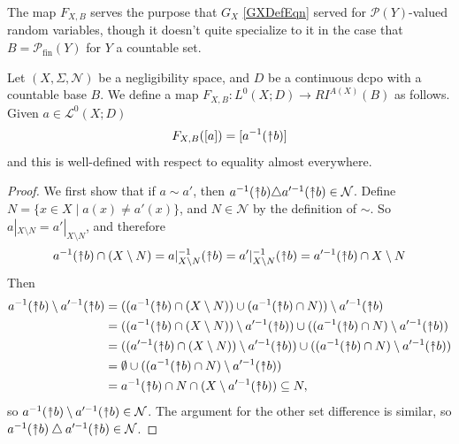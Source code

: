 \documentclass{lmcs}
\newcommand{\pfin}{\ensuremath{\powerset_{\mathrm{fin}}}}
\newcommand{\uu}{\rotatebox[origin=c]{90}{$\twoheadrightarrow$}}
\newcommand{\Ell}{\mathcal{L}}
\newcommand{\En}{\mathcal{N}}
\newcommand{\powerset}{\ensuremath{\mathcal{P}}}
\newcommand{\symdiff}{\mathbin{\triangle}}
\begin{document}
The map $F_{X,B}$ serves the purpose that $G_X$ \eqref{GXDefEqn} served for $\powerset(Y)$-valued random variables, though it doesn't quite specialize to it in the case that $B = \pfin(Y)$ for $Y$ a countable set. 

\begin{defi}
Let $(X,\Sigma,\En)$ be a negligibility space, and $D$ be a continuous dcpo with a countable base $B$. We define a map $F_{X,B} : L^0(X;D) \rightarrow RI^{A(X)}(B)$ as follows. Given $a \in \Ell^0(X;D)$
\[
F_{X,B}([a]) = [a^{-1}(\uu b)]
\]
and this is well-defined with respect to equality almost everywhere. 
\end{defi}
\begin{proof}
We first show that if $a \sim a'$, then $a^{-1}(\uu b) \triangle a'^{-1}(\uu b) \in \En$. Define $N = \{ x \in X \mid a(x) \neq a'(x) \}$, and $N \in \En$ by the definition of $\sim$. So $a|_{X \setminus N} = a'|_{X \setminus N}$, and therefore 
\[
a^{-1}(\uu b) \cap (X \setminus N) = a|_{X \setminus N}^{-1}(\uu b) = a'|_{X \setminus N}^{-1}(\uu b) = a'^{-1}(\uu b) \cap X \setminus N
\]
Then
\begin{align*}
a^{-1}(\uu b) \setminus a'^{-1}(\uu b) &= ((a^{-1}(\uu b) \cap (X \setminus N)) \cup (a^{-1}(\uu b) \cap N)) \setminus a'^{-1}(\uu b) \\
 &= ((a^{-1}(\uu b) \cap (X \setminus N)) \setminus a'^{-1}(\uu b)) \cup ((a^{-1}(\uu b) \cap N) \setminus a'^{-1}(\uu b)) \\
 &= ((a'^{-1}(\uu b) \cap (X \setminus N)) \setminus a'^{-1}(\uu b)) \cup ((a^{-1}(\uu b) \cap N) \setminus a'^{-1}(\uu b)) \\
 &= \emptyset \cup ((a^{-1}(\uu b) \cap N) \setminus a'^{-1}(\uu b)) \\
 &= a^{-1}(\uu b) \cap N \cap (X \setminus a'^{-1}(\uu b)) \subseteq N,
\end{align*}
so $a^{-1}(\uu b) \setminus a'^{-1}(\uu b) \in \En$. The argument for the other set difference is similar, so $a^{-1}(\uu b) \symdiff a'^{-1}(\uu b) \in \En$. 


\end{proof}
\end{document}
